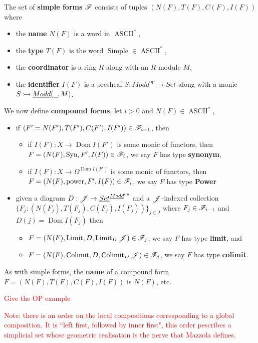 \begin{defn}
 The set of \textbf{simple forms} $\scr{F}$ consists of tuples $(N(F),T(F),C(F),I(F))$ where
 \begin{itemize}
  \item the \textbf{name} $N(F)$ is a word in $\operatorname{ASCII}^\ast$,
  \item the \textbf{type} $T(F)$ is the word $\operatorname{Simple} \in \operatorname{ASCII}^\ast$,
  \item the \textbf{coordinator} is a ring $R$ along with an $R$-module $M$,
  \item the \textbf{identifier} $I(F)$ is a presheaf $S: \underline{Modd}^{\text{op}} \to \underline{Set}$ along with a monic $S \rightarrowtail \underline{Modd}(\und{0.2},M)$.
 \end{itemize}
 We now define \textbf{compound forms}, let $i > 0$ and $N(F) \in \operatorname{ASCII}^\ast$,
 \begin{itemize}
  \item if $(F' = N(F'), T(F'), C(F'), I(F')) \in \scr{F}_{i - 1}$, then
  \begin{itemize}
   \item if $I(F): X \to \operatorname{Dom}I(F')$ is some monic of functors, then $F = (N(F), \operatorname{Syn}, F', I(F)) \in \scr{F}_{i}$, we say $F$ has type \textbf{synonym},
   \item if $I(F): X \to \Omega^{\operatorname{Dom}I(F')}$ is some monic of functors, then $F = (N(F), \operatorname{power}, F', I(F)) \in \scr{F}_i$, we say $F$ has type \textbf{Power}
  \end{itemize}
    \item given a diagram $D: \scr{J} \to \underline{Set}^{\underline{Modd}^{op}}$ and a $\scr{J}$-indexed collection $\lbrace F_j: (N(F_j),T(F_j), C(F_j), I(F_j))\rbrace_{j \in J}$ where $F_j \in \scr{F}_{i-1}$ and $D(j) = \operatorname{Dom}I(F_j)$ then
    \begin{itemize}
     \item $F = (N(F), \operatorname{Limit}, D, \operatorname{Limit}_{D}\scr{J}) \in \scr{F}_j$, we say $F$ has type \textbf{limit}, and
     \item $F = (N(F), \operatorname{Colimit}, D, \operatorname{Colimit}_D\scr{J}) \in \scr{F}_j$, we say $F$ has type \textbf{colimit}.
    \end{itemize}
 \end{itemize}
As with simple forms, the \textbf{name} of a compound form $F = (N(F), T(F), C(F), I(F))$ is $N(F)$, etc.
\end{defn}
\begin{example}
 \textcolor{red}{Give the OP example}
\end{example}
\textcolor{red}{Note: there is an order on the local compositions corresponding to a global composition. It is ``left first, followed by inner first", this order pescribes a simplicial set whose geometric realisation is the nerve that Mazzola defines.}
